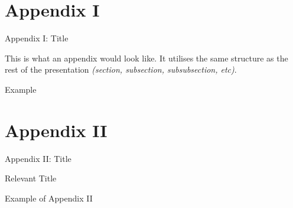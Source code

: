 
\section{Appendix I} \label{app1}
\begin{frame}
{\Large Appendix I: Title}
    \begin{remark}
    This is what an appendix would look like. It utilises the same structure as the rest of the presentation \textit{(section, subsection, subsubsection, etc)}.
    \end{remark}
    \begin{exampleblock}{Example}
    \textcolor{mygrey}{\lipsum[2][1-20]}
    \end{exampleblock}
\end{frame}

\section{Appendix II} \label{app2}
\begin{frame}
{\Large Appendix II: Title} 
    \begin{block}{Relevant Title}
    \textcolor{mygrey}{\lipsum[2][1]}
    \end{block}
    \begin{exampleblock}{Example of Appendix II}
    \textcolor{mygrey}{\lipsum[4][1-20]}
    \end{exampleblock}
\end{frame}